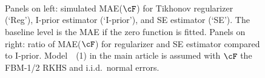 \documentclass[preprint,12pt,authoryear]{elsarticle}
\begin{document}
\begin{figure}[tbp]
	\centering
	\\
	\\
	\\
	\caption{Panels on left: simulated MAE($\cF$) for Tikhonov regularizer (`Reg'), I-prior estimator (`I-prior'), and SE estimator (`SE'). The baseline level is the MAE if the zero function is fitted.  
		Panels on right: ratio of MAE($\cF$) for regularizer and SE estimator compared to I-prior.
		Model~~(1) in the main article is assumed with $\cF$ the FBM-1/2 RKHS and i.i.d.\  normal errors. }
	\label{fig-sim2}
\end{figure}


%
%


%
%
\end{document}
